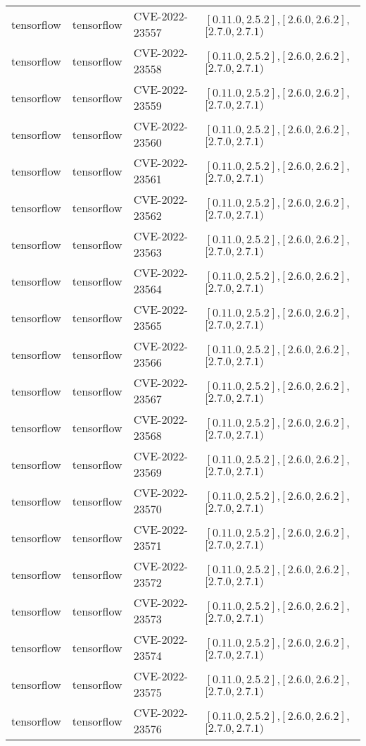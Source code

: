\begin{tabular}{llll}
tensorflow & tensorflow & CVE-2022-23557 & $[0.11.0,2.5.2]$,$[2.6.0,2.6.2]$,$[2.7.0,2.7.1)$ \\
tensorflow & tensorflow & CVE-2022-23558 & $[0.11.0,2.5.2]$,$[2.6.0,2.6.2]$,$[2.7.0,2.7.1)$ \\
tensorflow & tensorflow & CVE-2022-23559 & $[0.11.0,2.5.2]$,$[2.6.0,2.6.2]$,$[2.7.0,2.7.1)$ \\
tensorflow & tensorflow & CVE-2022-23560 & $[0.11.0,2.5.2]$,$[2.6.0,2.6.2]$,$[2.7.0,2.7.1)$ \\
tensorflow & tensorflow & CVE-2022-23561 & $[0.11.0,2.5.2]$,$[2.6.0,2.6.2]$,$[2.7.0,2.7.1)$ \\
tensorflow & tensorflow & CVE-2022-23562 & $[0.11.0,2.5.2]$,$[2.6.0,2.6.2]$,$[2.7.0,2.7.1)$ \\
tensorflow & tensorflow & CVE-2022-23563 & $[0.11.0,2.5.2]$,$[2.6.0,2.6.2]$,$[2.7.0,2.7.1)$ \\
tensorflow & tensorflow & CVE-2022-23564 & $[0.11.0,2.5.2]$,$[2.6.0,2.6.2]$,$[2.7.0,2.7.1)$ \\
tensorflow & tensorflow & CVE-2022-23565 & $[0.11.0,2.5.2]$,$[2.6.0,2.6.2]$,$[2.7.0,2.7.1)$ \\
tensorflow & tensorflow & CVE-2022-23566 & $[0.11.0,2.5.2]$,$[2.6.0,2.6.2]$,$[2.7.0,2.7.1)$ \\
tensorflow & tensorflow & CVE-2022-23567 & $[0.11.0,2.5.2]$,$[2.6.0,2.6.2]$,$[2.7.0,2.7.1)$ \\
tensorflow & tensorflow & CVE-2022-23568 & $[0.11.0,2.5.2]$,$[2.6.0,2.6.2]$,$[2.7.0,2.7.1)$ \\
tensorflow & tensorflow & CVE-2022-23569 & $[0.11.0,2.5.2]$,$[2.6.0,2.6.2]$,$[2.7.0,2.7.1)$ \\
tensorflow & tensorflow & CVE-2022-23570 & $[0.11.0,2.5.2]$,$[2.6.0,2.6.2]$,$[2.7.0,2.7.1)$ \\
tensorflow & tensorflow & CVE-2022-23571 & $[0.11.0,2.5.2]$,$[2.6.0,2.6.2]$,$[2.7.0,2.7.1)$ \\
tensorflow & tensorflow & CVE-2022-23572 & $[0.11.0,2.5.2]$,$[2.6.0,2.6.2]$,$[2.7.0,2.7.1)$ \\
tensorflow & tensorflow & CVE-2022-23573 & $[0.11.0,2.5.2]$,$[2.6.0,2.6.2]$,$[2.7.0,2.7.1)$ \\
tensorflow & tensorflow & CVE-2022-23574 & $[0.11.0,2.5.2]$,$[2.6.0,2.6.2]$,$[2.7.0,2.7.1)$ \\
tensorflow & tensorflow & CVE-2022-23575 & $[0.11.0,2.5.2]$,$[2.6.0,2.6.2]$,$[2.7.0,2.7.1)$ \\
tensorflow & tensorflow & CVE-2022-23576 & $[0.11.0,2.5.2]$,$[2.6.0,2.6.2]$,$[2.7.0,2.7.1)$ \\

\end{tabular}
